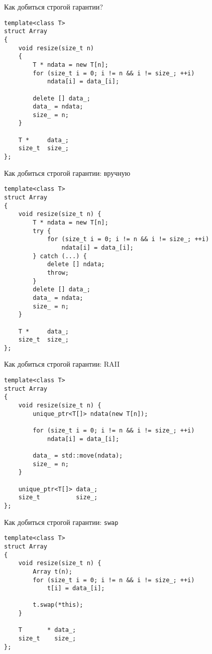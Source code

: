 \documentclass[aspectration=1610,t]{beamer}
\begin{document}
\begin{frame}[fragile]{Как добиться строгой гарантии?}
    \begin{lstlisting}
template<class T>
struct Array 
{
    void resize(size_t n) 
    {
        T * ndata = new T[n];
        for (size_t i = 0; i != n && i != size_; ++i)
            ndata[i] = data_[i];

        delete [] data_;
        data_ = ndata;
        size_ = n;    
    }

    T *     data_;
    size_t  size_;
};
    \end{lstlisting}
\end{frame}

\begin{frame}[fragile]{Как добиться строгой гарантии: вручную}
    \begin{lstlisting}
template<class T> 
struct Array 
{
    void resize(size_t n) {
        T * ndata = new T[n];
        try { 
            for (size_t i = 0; i != n && i != size_; ++i)
                ndata[i] = data_[i];
        } catch (...) { 
            delete [] ndata;
            throw;
        }
        delete [] data_;
        data_ = ndata;
        size_ = n;    
    }
    
    T *     data_;
    size_t  size_;
};
    \end{lstlisting}
\end{frame}

\begin{frame}[fragile]{Как добиться строгой гарантии: RAII}
\begin{lstlisting}
template<class T>
struct Array 
{
    void resize(size_t n) {
        unique_ptr<T[]> ndata(new T[n]);

        for (size_t i = 0; i != n && i != size_; ++i)
            ndata[i] = data_[i];

        data_ = std::move(ndata);
        size_ = n;    
    }

    unique_ptr<T[]> data_;
    size_t          size_;
};
\end{lstlisting}
\end{frame}

\begin{frame}[fragile]{Как добиться строгой гарантии: \texttt{swap}}
\begin{lstlisting}
template<class T>
struct Array 
{
    void resize(size_t n) {
        Array t(n);
        for (size_t i = 0; i != n && i != size_; ++i)
            t[i] = data_[i];

        t.swap(*this);
    }

    T       * data_;
    size_t    size_;
};
\end{lstlisting}
\end{frame}
\end{document}

